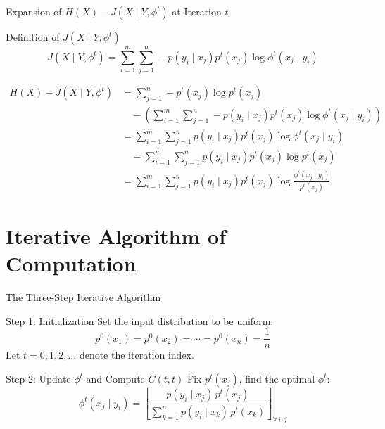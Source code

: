 \documentclass{beamer}
\begin{document}
    \begin{frame}{Expansion of $H(X) - J(X \mid Y, \phi^t)$ at Iteration $t$}
        \vspace*{-0.5em}
        \begin{block}{Definition of $J(X \mid Y, \phi^t)$}
            $$
            J(X \mid Y, \phi^t) = \sum_{i=1}^{m} \sum_{j=1}^{n} -p(y_i \mid x_j) p^t(x_j) \log \phi^t(x_j \mid y_i)
            $$
        \end{block}

        \vspace*{-1.4em}
        \small
        \setlength{\jot}{1pt}
        \begin{align*}
            H(X) - J(X \mid Y, \phi^t)
            &= \sum_{j=1}^{n} -p^t(x_j) \log p^t(x_j) \\
            &\quad - \left( \sum_{i=1}^{m} \sum_{j=1}^{n} -p(y_i \mid x_j) p^t(x_j) \log \phi^t(x_j \mid y_i) \right) \\
            &= \sum_{i=1}^{m} \sum_{j=1}^{n} p(y_i \mid x_j) p^t(x_j) \log \phi^t(x_j \mid y_i) \\
            &\quad - \sum_{i=1}^{m} \sum_{j=1}^{n} p(y_i \mid x_j) p^t(x_j) \log p^t(x_j) \\
            &= \sum_{i=1}^{m} \sum_{j=1}^{n} p(y_i \mid x_j) p^t(x_j) \log \frac{\phi^t(x_j \mid y_i)}{p^t(x_j)}
        \end{align*}
    \end{frame}

\section{Iterative Algorithm of Computation}

\begin{frame}{The Three-Step Iterative Algorithm}
    \begin{block}{Step 1: Initialization}
        Set the input distribution to be uniform:
        $$
            p^0(x_1) = p^0(x_2) = \cdots = p^0(x_n) = \frac{1}{n}
        $$
        Let $t = 0, 1, 2, \ldots$ denote the iteration index.
    \end{block}

    \begin{block}{Step 2: Update $\phi^t$ and Compute $C(t,t)$}
        Fix $p^t(x_j)$, find the optimal $\phi^t$:
        $$
            \phi^t(x_j \mid y_i) = \left[ \frac{p(y_i \mid x_j)\, p^t(x_j)}{\sum_{k=1}^{n} p(y_i \mid x_k)\, p^t(x_k)} \right]_{\forall\, i,j}
        $$
    \end{block}
\end{frame}
\end{document}
